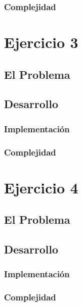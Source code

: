 \documentclass[10pt,a4paper]{article}
\begin{document}
\subsubsection{Complejidad}
\section{Ejercicio 3}
\subsection{El Problema}
\subsection{Desarrollo}
\subsubsection{Implementación}
\subsubsection{Complejidad}
\section{Ejercicio 4}
\subsection{El Problema}
\subsection{Desarrollo}
\subsubsection{Implementación}
\subsubsection{Complejidad}
\end{document}
